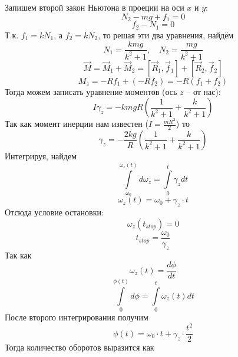 \documentclass[a5paper,10pt]{article}
\begin{document}
Запишем второй закон Ньютона в проеции на оси $x$ и $y$:
\begin{equation}
	N_2-mg+f_1=0
\end{equation}
\begin{equation}
	f_2-N_1=0
\end{equation}
Т.к. $f_1=kN_1$, а $f_2=kN_2$, то решая эти два уравнения, найдём
\begin{equation}
	N_1=\frac{kmg}{k^2+1}, \quad
	N_2=\frac{mg}{k^2+1}
\end{equation}
\begin{equation}
	\vec{M}=\vec{M}_1+\vec{M}_2=[\vec{R}_1,\vec{f}_1]+[\vec{R}_2,\vec{f}_2]
\end{equation}
\begin{equation}
	M_z=-Rf_1+(-Rf_2)=-R(f_1+f_2)
\end{equation}
Тогда можем записать уравнение моментов (ось $z$ -- от нас):
\begin{equation}
	I\gamma_z=-kmgR	\left(
						\frac{1}{k^2+1}+
						\frac{k}{k^2+1}
					\right)
\end{equation}
Так как момент инерции нам известен ($I=\frac{mR^2}{2}$) то
\begin{equation}
	\gamma_z=-\frac{2kg}{R}
					\left(
						\frac{1}{k^2+1}+
						\frac{k}{k^2+1}
					\right)
\end{equation}
Интегрируя, найдем
\begin{equation}
	\int\limits_{\omega_0}^{\omega_z(t)}{d\omega_z}=
	\int\limits_0^t \gamma_z dt
\end{equation}
\begin{equation}
	\omega_z(t)=\omega_0+\gamma_z\cdot t
\end{equation}
Отсюда условие остановки:
\begin{equation}
	\omega_z(t_{stop})=0
\end{equation}
\begin{equation}
	t_{stop}=\frac{\omega_0}{\gamma_z}
\end{equation}
Так как
\begin{equation}
	\omega_z(t)=\frac{d\phi}{dt}
\end{equation}
\begin{equation}
	\int\limits_{0}^{\phi(t)}{d\phi}=
	\int\limits_0^t \omega_z(t) dt
\end{equation}
После второго интегрирования получим
\begin{equation}
	\phi(t)=\omega_0\cdot t+\gamma_z\cdot \frac{t^2}{2}
\end{equation}
Тогда количество оборотов выразится как
\end{document}

